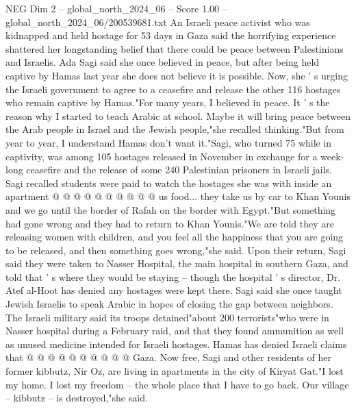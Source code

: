 \begin{textsample}{NEG Dim 2 – global\_north\_2024\_06 – Score 1.00 – global\_north\_2024\_06/200539681.txt}  \label{ex:f2_neg_125}
An Israeli peace activist who was kidnapped and held hostage for 53 days in Gaza said the horrifying experience shattered her longstanding belief that there could be peace between Palestinians and Israelis.
Ada Sagi said she once believed in peace, but after being held captive by Hamas last year she does not believe it is possible.
Now, she ' s urging the Israeli government to agree to a ceasefire and release the other 116 hostages who remain captive by Hamas."For many years, I believed in peace.
It ' s the reason why I started to teach Arabic at school.
Maybe it will bring peace between the Arab people in Israel and the Jewish people,"she recalled thinking."But from year to year, I understand Hamas don't want it."Sagi, who turned 75 while in captivity, was among 105 hostages released in November in exchange for a week-long ceasefire and the release of some 240 Palestinian prisoners in Israeli jails.
Sagi recalled students were paid to watch the hostages she was with inside an apartment @ @ @ @ @ @ @ @ @ @ us food... they take us by car to Khan Younis and we go until the border of Rafah on the border with Egypt."But something had gone wrong and they had to return to Khan Younis."We are told they are releasing women with children, and you feel all the happiness that you are going to be released, and then something goes wrong,"she said.
Upon their return, Sagi said they were taken to Nasser Hospital, the main hospital in southern Gaza, and told that ' s where they would be staying -- though the hospital ' s director, Dr.
Atef al-Hoot has denied any hostages were kept there.
Sagi said she once taught Jewish Israelis to speak Arabic in hopes of closing the gap between neighbors.
The Israeli military said its troops detained"about 200 terrorists"who were in Nasser hospital during a February raid, and that they found ammunition as well as unused medicine intended for Israeli hostages.
Hamas has denied Israeli claims that @ @ @ @ @ @ @ @ @ @ Gaza.
Now free, Sagi and other residents of her former kibbutz, Nir Oz, are living in apartments in the city of Kiryat Gat."I lost my home.
I lost my freedom -- the whole place that I have to go back.
Our village -- kibbutz -- is destroyed,"she said.

\end{textsample}
